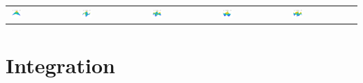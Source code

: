 \documentclass[11pt,compress,xcolor={usenames,dvipsnames},aspectratio=169]{beamer}
\begin{document}
\begin{frame}
\begin{tabular}{>{\centering}m{}>{\centering}m{}>{\centering}m{}>{\centering}m{}>{\centering}m{}}
\includegraphics[width =0.18\textwidth]{ProgramsImages/Chebyshev_Degree_1_1.png}  &
\includegraphics[width =0.18\textwidth]{ProgramsImages/Chebyshev_Degree_1_2.png}  &
\includegraphics[width =0.18\textwidth]{ProgramsImages/Chebyshev_Degree_1_3.png}  &
\includegraphics[width =0.18\textwidth]{ProgramsImages/Chebyshev_Degree_2_2.png}  &
\includegraphics[width =0.18\textwidth]{ProgramsImages/Chebyshev_Degree_2_3.png} 
	\end{tabular}
\end{frame}

\section{Integration}
\end{document}
